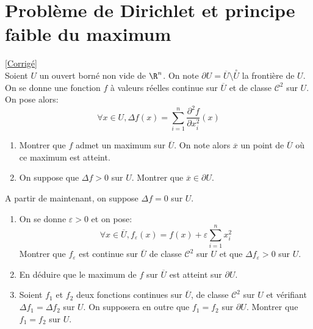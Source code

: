 \documentclass{book}
\begin{document}
\section{Problème de Dirichlet et principe faible du maximum}
\label{Problème de Dirichlet et principe faible du maximum}
\textcolor{blue}{\hyperref[sec:probleme-de-dirichlet-et-principe-du-maximum]{[Corrigé]}}\\
Soient $U$ un ouvert borné non vide de $\R^n$. On note $\partial U=\overline{U}\setminus \overset{\circ}{U}$ la frontière de $U$.
On se donne une fonction $f$ à valeurs réelles continue sur $\overline{U}$ et de classe $\mathcal{C}^2$ sur $U$. On pose alors: $$\forall x\in U, \Delta f(x)=\displaystyle\sum\limits_{i=1}^n\frac{\partial^2 f}{\partial x_i^2}(x)$$
\begin{enumerate}
	\item Montrer que $f$ admet un maximum sur $\overline{U}$. On note alors $\overline{x}$ un point de $\overline{U}$ où ce maximum est atteint.
	\item On suppose que $\Delta f>0$ sur $U$. Montrer que $\overline{x}\in\partial U$.
\end{enumerate}
A partir de maintenant, on suppose $\Delta f=0$ sur $U$.
\begin{enumerate}[resume]
	\item On se donne $\varepsilon >0$ et on pose: $$\forall x\in \overline{U}, f_{\varepsilon}(x)=f(x)+\varepsilon\displaystyle\sum\limits_{i=1}^nx_i^2$$
	Montrer que $f_\varepsilon$ est continue sur $\overline{U}$ de classe $\mathcal{C}^2$ sur $U$ et que $\Delta f_{\varepsilon}>0$ sur $U$.
	\item En déduire que le maximum de $f$ sur $\overline{U}$ est atteint sur $\partial U$.
	\item Soient $f_1$ et $f_2$ deux fonctions continues sur $\overline{U}$, de classe $\mathcal{C}^2$ sur $U$ et vérifiant $\Delta f_1=\Delta f_2$ sur $U$. On supposera en outre que $f_1=f_2$ sur $\partial U$. Montrer que $f_1=f_2$ sur $U$.
\end{enumerate}
\end{document}
